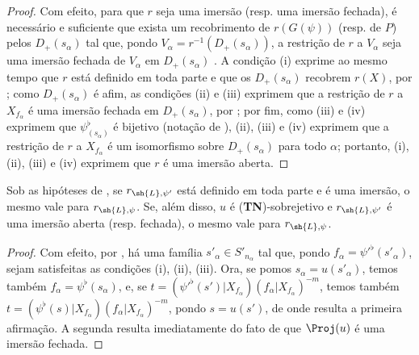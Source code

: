 \documentclass[oneside,10pt]{amsart}
\let\EGAOriginalLabel\label
\renewcommand{\label}[1]{\phantomsection\EGAOriginalLabel{#1}}
\begin{document}
\begin{proof}
Com efeito, para que $r$ seja uma imersão (resp. uma imersão fechada), é necessário e suficiente que exista um recobrimento de $r(G(\psi))$ (resp. de $P$) pelos $D_+(s_\alpha)$ tal que, pondo $V_\alpha=r^{-1}(D_+(s_\alpha))$, a restrição de $r$ a $V_\alpha$ seja uma imersão fechada de $V_\alpha$ em $D_+(s_\alpha)$ .
A condição (i) exprime ao mesmo tempo que $r$ está definido em toda parte e que os $D_+(s_\alpha)$ recobrem $r(X)$, por ;
como $D_+(s_\alpha)$ é afim, as condições (ii) e (iii) exprimem que a restrição de $r$ a $X_{f_\alpha}$ é uma imersão fechada em $D_+(s_\alpha)$, por ;
por fim, como (iii) e (iv) exprimem que $\psi_{(s_\alpha)}^\flat$ é bijetivo (notação de ), (ii), (iii) e (iv) exprimem que a restrição de $r$ a $X_{f_\alpha}$ é um isomorfismo sobre $D_+(s_\alpha)$ para todo $\alpha$;
portanto, (i), (ii), (iii) e (iv) exprimem que $r$ é uma imersão aberta.
\end{proof}

\begin{corollary}[3.8.3]
\label{II.3.8.3}
Sob as hipóteses de , se $r_{\sh{L},\psi'}$ está definido em toda parte e é uma imersão, o mesmo vale para $r_{\sh{L},\psi}$.
Se, além disso, $u$ é (\textbf{TN})-sobrejetivo e $r_{\sh{L},\psi'}$ é uma imersão aberta (resp. fechada), o mesmo vale para $r_{\sh{L},\psi}$.
\end{corollary}

\begin{proof}
Com efeito, por , há uma família $s'_\alpha\in S'_{n_\alpha}$ tal que, pondo $f_\alpha=\psi'^\flat(s'_\alpha)$, sejam satisfeitas as condições (i), (ii), (iii).
Ora, se pomos $s_\alpha=u(s'_\alpha)$, temos também $f_\alpha=\psi^\flat(s_\alpha)$, e, se $t=(\psi'^\flat(s')|X_{f_\alpha})(f_\alpha|X_{f_\alpha})^{-m}$, temos também $t=(\psi^\flat(s)|X_{f_\alpha})(f_\alpha|X_{f_\alpha})^{-m}$, pondo $s=u(s')$, de onde resulta a primeira afirmação.
A segunda resulta imediatamente do fato de que $\Proj(u)$ é uma imersão fechada.
\end{proof}
\end{document}
